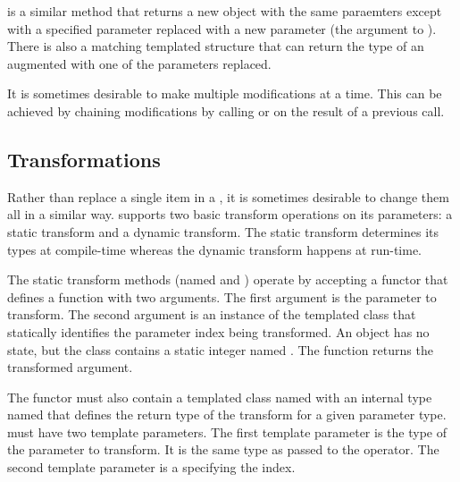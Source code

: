 
 is a similar method that returns a new
 object with the same paraemters except
with a specified parameter replaced with a new parameter (the argument to
). There is also a matching 
templated structure that can return the type of an augmented
 with one of the parameters replaced.



It is sometimes desirable to make multiple modifications at a time. This
can be achieved by chaining modifications by calling  or
 on the result of a previous call.


\subsection{Transformations}

Rather than replace a single item in a ,
it is sometimes desirable to change them all in a similar
way.  supports two basic transform
operations on its parameters: a static transform and a dynamic
transform. The static transform determines its types at compile-time
whereas the dynamic transform happens at run-time.


The static transform methods (named  and
) operate by accepting a functor that defines
a function with two arguments. The first argument is the
 parameter to transform. The second
argument is an instance of the  templated class that
statically identifies the parameter index being transformed. An
 object has no state, but the class contains a
static integer named . The function returns the
transformed argument.

The functor must also contain a templated class named 
with an internal type named  that defines the return type of
the transform for a given parameter type.  must have
two template parameters. The first template parameter is the type of the
 parameter to transform. It is the same
type as passed to the operator. The second template parameter is a
 specifying the index.

